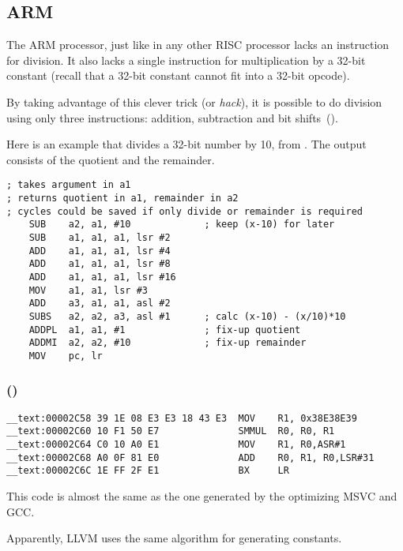 ﻿\subsection{ARM}

The ARM processor, just like in any other  RISC processor lacks an instruction for division.
It also lacks a single instruction for multiplication by a 32-bit constant (recall that a 32-bit
constant cannot fit into a 32-bit opcode).

By taking advantage of this clever trick (or \emph{hack}), it is possible to do division using only three instructions: addition,
subtraction and bit shifts~().

Here is an example that divides a 32-bit number by 10, from
.
The output consists of the quotient and the remainder.

\begin{lstlisting}[style=customasmARM]
; takes argument in a1
; returns quotient in a1, remainder in a2
; cycles could be saved if only divide or remainder is required
    SUB    a2, a1, #10             ; keep (x-10) for later
    SUB    a1, a1, a1, lsr #2
    ADD    a1, a1, a1, lsr #4
    ADD    a1, a1, a1, lsr #8
    ADD    a1, a1, a1, lsr #16
    MOV    a1, a1, lsr #3
    ADD    a3, a1, a1, asl #2
    SUBS   a2, a2, a3, asl #1      ; calc (x-10) - (x/10)*10
    ADDPL  a1, a1, #1              ; fix-up quotient
    ADDMI  a2, a2, #10             ; fix-up remainder
    MOV    pc, lr
\end{lstlisting}

\subsubsection{\OptimizingXcodeIV (\ARMMode)}

\begin{lstlisting}[style=customasmARM]
__text:00002C58 39 1E 08 E3 E3 18 43 E3  MOV    R1, 0x38E38E39
__text:00002C60 10 F1 50 E7              SMMUL  R0, R0, R1
__text:00002C64 C0 10 A0 E1              MOV    R1, R0,ASR#1
__text:00002C68 A0 0F 81 E0              ADD    R0, R1, R0,LSR#31
__text:00002C6C 1E FF 2F E1              BX     LR
\end{lstlisting}

This code is almost the same as the one generated by the optimizing MSVC and GCC.

Apparently, LLVM uses the same algorithm for generating constants.

